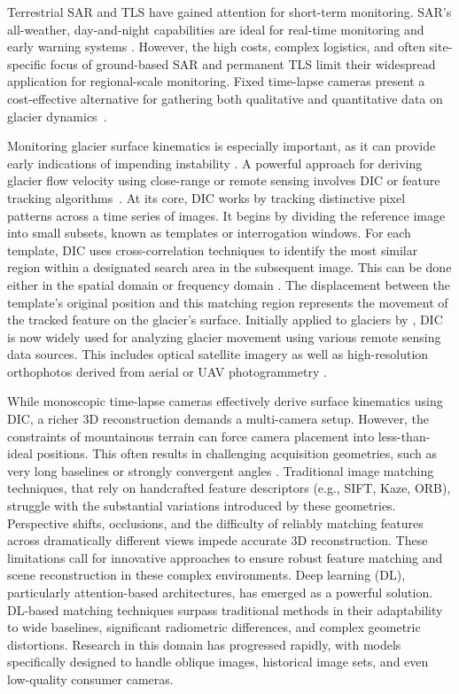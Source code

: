 Terrestrial SAR and TLS have gained attention for short-term monitoring. 
SAR's all-weather, day-and-night capabilities are ideal for real-time monitoring and early warning systems \citet{Noferini2009, Dematteis2021}. 
However, the high costs, complex logistics, and often site-specific focus of ground-based SAR and permanent TLS limit their widespread application for regional-scale monitoring.
Fixed time-lapse cameras present a cost-effective alternative for gathering both qualitative and quantitative data on glacier dynamics~\citep{Giordan2016, James2016, Maas2006, Messerli2015}.

Monitoring glacier surface kinematics is especially important, as it can provide early indications of impending instability \citep{Faillettaz2015}.
A powerful approach for deriving glacier flow velocity using close-range or remote sensing involves DIC or feature tracking algorithms~\citep{ahn_box_2010, Giordan2016, Hadhri2019}.
At its core, DIC works by tracking distinctive pixel patterns across a time series of images.
It begins by dividing the reference image into small subsets, known as templates or interrogation windows. 
For each template, DIC uses cross-correlation techniques to identify the most similar region within a designated search area in the subsequent image.
This can be done either in the spatial domain \citep{Scambos1992} or frequency domain \citep{rolstad1997}.
The displacement between the template’s original position and this matching region represents the movement of the tracked feature on the glacier's surface.
Initially applied to glaciers by \citet{Scambos1992}, DIC is now widely used for analyzing glacier movement using various remote sensing data sources.
This includes optical satellite imagery \citep{Scambos1992, Scherler2008, Heid2012_evaluation_xcorr} as well as high-resolution orthophotos derived from aerial or UAV photogrammetry \citep{immerzeel2014, Chudley2019, ioli2021mid}.

While monoscopic time-lapse cameras effectively derive surface kinematics using DIC, a richer 3D reconstruction demands a multi-camera setup. 
However, the constraints of mountainous terrain can force camera placement into less-than-ideal positions. 
This often results in challenging acquisition geometries, such as very long baselines or strongly convergent angles \citep{ioli2024deep}.
Traditional image matching techniques, that rely on handcrafted feature descriptors (e.g., SIFT, Kaze, ORB), struggle with the substantial variations introduced by these geometries.  Perspective shifts, occlusions, and the difficulty of reliably matching features across dramatically different views impede accurate 3D reconstruction. 
These limitations call for innovative approaches to ensure robust feature matching and scene reconstruction in these complex environments.
Deep learning (DL), particularly attention-based architectures, has emerged as a powerful solution. 
DL-based matching techniques surpass traditional methods in their adaptability to wide baselines, significant radiometric differences, and complex geometric distortions. 
Research in this domain has progressed rapidly, with models specifically designed to handle oblique images, historical image sets, and even low-quality consumer cameras.

